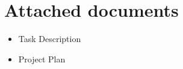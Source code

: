 \documentclass[
	overfullrule,
	paper = a4, twoside, openright, BCOR = 5mm,
	headinclude, footexclude,
	fontsize = 11pt,
	cleardoublepage = empty,
	titlepage, abstract = on,
	automark,
	numbers = noenddot
]{scrreprt}
\begin{document}
  \section{Attached documents}
	\begin{itemize}
		\item Task Description
		\item Project Plan
	\end{itemize}
\end{document}
